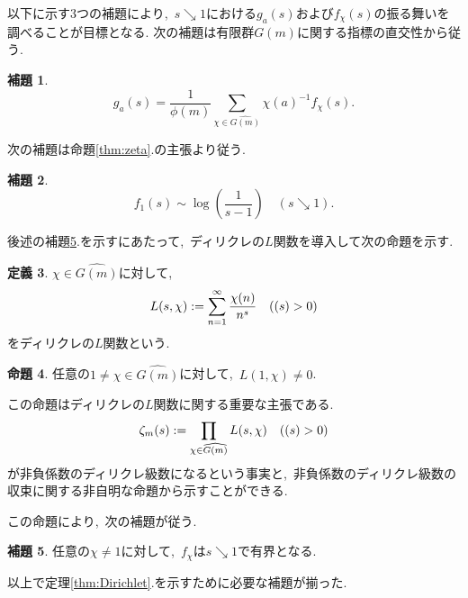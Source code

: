 \documentclass[uplatex,12pt]{jsarticle}
\numberwithin{equation}{section}
\theoremstyle{definition}
\newtheorem{definition}{定義}[section]
\newtheorem{proposition}[definition]{命題}
\newtheorem{lemma}[definition]{補題}
\newcommand{\dprod}{\displaystyle\prod}
\let\Re\relax
\DeclareMathOperator{\Re}{Re}
\begin{document}
以下に示す3つの補題により,\ $s\searrow1$における$g_a(s)$および$f_\chi(s)$の振る舞いを調べることが目標となる.
次の補題は有限群$G(m)$に関する指標の直交性から従う.
\begin{lemma}\label{lem:g_a}
\begin{equation}   
	g_a(s)=\frac{1}{\phi(m)}\sum_{\chi\in\widehat{G(m)}}\chi(a)^{-1}f_\chi(s).
\end{equation}
\end{lemma}


次の補題は命題\ref{thm:zeta}.の主張より従う.
\begin{lemma}\label{lem:f_1}
\begin{equation}   
	f_1(s) \sim \log\left(\frac{1}{s-1}\right) \quad (s\searrow 1).
\end{equation}
\end{lemma}


後述の補題\ref{lem:chi-bounded}.を示すにあたって,\ ディリクレの$L$関数を導入して次の命題を示す.
\begin{definition}
$\chi\in\widehat{G(m)}$に対して,
\begin{equation}
	L(s,\chi):=\sum_{n=1}^\infty \frac{\chi(n)}{n^s} \quad(\Re(s)>0)
\end{equation}
をディリクレの$L$関数という.
\end{definition}

\begin{proposition} \label{prop:L-1}
任意の$1\ne\chi\in\widehat{G(m)}$に対して,\ $L(1,\chi)\ne0$.
\end{proposition}

この命題はディリクレの$L$関数に関する重要な主張である.
\begin{equation}
	\zeta_m(s):=\dprod_{\chi\in\widehat{G(m)}}L(s,\chi) \quad(\Re(s)>0)
\end{equation}	
が非負係数のディリクレ級数になるという事実と,\ 非負係数のディリクレ級数の収束に関する非自明な命題から示すことができる.


この命題により,\ 次の補題が従う.

\begin{lemma}\label{lem:chi-bounded}
任意の$\chi\ne1$に対して,\ $f_\chi$は$s\searrow1$で有界となる.
\end{lemma}

以上で定理\ref{thm:Dirichlet}.を示すために必要な補題が揃った.
\end{document}
